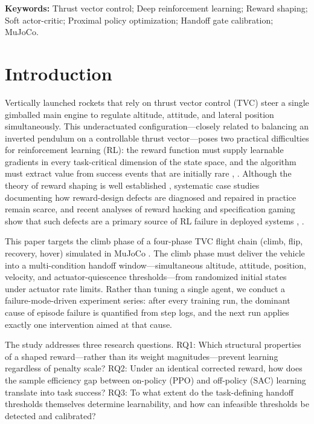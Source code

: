 \documentclass[11pt,a4paper]{article}
\begin{document}
\vspace{1ex}
\noindent \textbf{Keywords:} Thrust vector control; Deep reinforcement learning; Reward shaping; Soft actor-critic; Proximal policy optimization; Handoff gate calibration; MuJoCo.


\section{Introduction}

Vertically launched rockets that rely on thrust vector control (TVC) steer a single gimballed main engine to regulate altitude, attitude, and lateral position simultaneously. This underactuated configuration---closely related to balancing an inverted pendulum on a controllable thrust vector---poses two practical difficulties for reinforcement learning (RL): the reward function must supply learnable gradients in every task-critical dimension of the state space, and the algorithm must extract value from success events that are initially rare \cite{schulman2017ppo}, \cite{gaudet2020landing}. Although the theory of reward shaping is well established \cite{ng1999shaping}, systematic case studies documenting how reward-design defects are diagnosed and repaired in practice remain scarce, and recent analyses of reward hacking and specification gaming show that such defects are a primary source of RL failure in deployed systems \cite{amodei2016safety}, \cite{skalse2022gaming}.

This paper targets the climb phase of a four-phase TVC flight chain (climb, flip, recovery, hover) simulated in MuJoCo \cite{todorov2012mujoco}. The climb phase must deliver the vehicle into a multi-condition handoff window---simultaneous altitude, attitude, position, velocity, and actuator-quiescence thresholds---from randomized initial states under actuator rate limits. Rather than tuning a single agent, we conduct a failure-mode-driven experiment series: after every training run, the dominant cause of episode failure is quantified from step logs, and the next run applies exactly one intervention aimed at that cause.

The study addresses three research questions. RQ1: Which structural properties of a shaped reward---rather than its weight magnitudes---prevent learning regardless of penalty scale? RQ2: Under an identical corrected reward, how does the sample efficiency gap between on-policy (PPO) and off-policy (SAC) learning translate into task success? RQ3: To what extent do the task-defining handoff thresholds themselves determine learnability, and how can infeasible thresholds be detected and calibrated?
\end{document}
